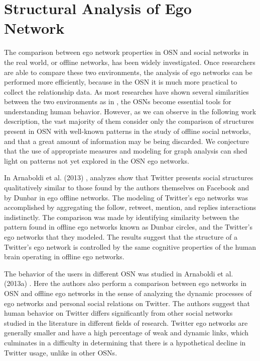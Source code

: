 

\section{Structural Analysis of Ego Network}
\label{sec:ego_net_analysis}

The comparison between ego network properties in OSN and social networks in the real world, or offline networks, has been widely investigated. Once researchers are able to compare these two environments, the analysis of ego networks can be performed more efficiently, because in the OSN it is much more practical to collect the relationship data. As most researches have shown several similarities between the two environments as in \cite{Gala2012,Arnaboldi:2012,Arnaboldi:2013,Arnaboldi:2013a,Arnaboldi:2016,Arnaboldi:2017a,ARNABOLDI2017}, the OSNs become essential tools for understanding human behavior. However, as we can observe in the following work description, the vast majority of them consider only the comparison of structures present in OSN with well-known patterns in the study of offline social networks, and that a great amount of information may be being discarded. We conjecture that the use of appropriate measures and modeling for graph analysis can shed light on patterns not yet explored in the OSN ego networks.

In Arnaboldi et al. (2013) \cite{Arnaboldi:2013}, analyzes show that Twitter presents social structures qualitatively similar to those found by the authors themselves on Facebook and by Dunbar in ego offline networks. The modeling of Twitter's ego networks was accomplished by aggregating the follow, retweet, mention, and replies interactions indistinctly. The comparison was made by identifying similarity between the pattern found in offline ego networks known as Dunbar circles, and the Twitter's ego networks that they modeled. The results suggest that the structure of a Twitter's ego network is controlled by the same cognitive properties of the human brain operating in offline ego networks.

The behavior of the users in different OSN was studied in Arnaboldi et al. (2013a) \cite{Arnaboldi:2013a}. Here the authors also perform a comparison between ego networks in OSN and offline ego networks in the sense of analyzing the dynamic processes of ego networks and personal social relations on Twitter. The authors suggest that human behavior on Twitter differs significantly from other social networks studied in the literature in different fields of research. Twitter ego networks are generally smaller and have a high percentage of weak and dynamic links, which culminates in a difficulty in determining that there is a hypothetical decline in Twitter usage, unlike in other OSNs.

